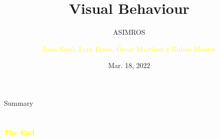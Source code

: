 \documentclass[aspectratio=43]{beamer}
\title{Visual Behaviour} %
\subtitle{ASIMROS}
\author{\textcolor{yellow}{Juan Simó, Lara Poves, Óscar Martínez y 
Rubén Montes}}
\institute[URJC]{
    \textcolor{white}{Robótica Software}%
    \\%
    \textcolor{white}{Universidad Rey Juan Carlos}%
} %
\date{Mar. 18, 2022}
\begin{document}
    
    \frame{\titlepage}
    
    \begin{frame}{Summary}
        \tableofcontents
    \end{frame}
    
    
    
    
    
     
    
    
    
    \section{}
    \begin{frame}{}
        \centering
            \Huge\bfseries
        \textcolor{yellow}{The End}
    \end{frame}
\end{document}
